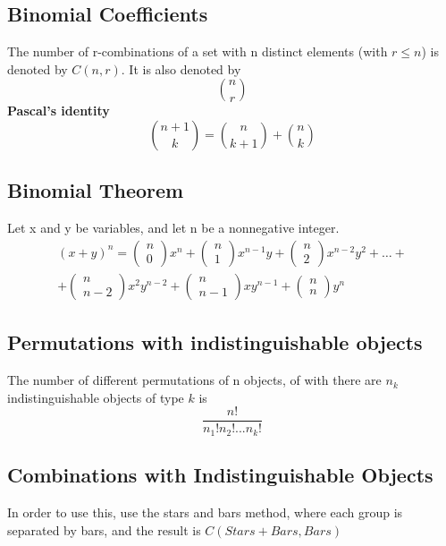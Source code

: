 \documentclass{article}[18pt]
\begin{document}
\subsection{Binomial Coefficients}
The number of r-combinations of a set with n distinct elements (with $r\leqslant n$) is denoted by $C(n,r)$. It is also denoted by
$$\binom{n}{r}$$
\textbf{Pascal's identity}
$$\binom{n+1}{k}=\binom{n}{k+1}+\binom{n}{k}$$
\subsection{Binomial Theorem}
Let x and y be variables, and let n be a nonnegative integer.
$$
\begin{array}{c}{(x+y)^{n}=\left( \begin{array}{c}{n} \\ {0}\end{array}\right) x^{n}+\left( \begin{array}{c}{n} \\ {1}\end{array}\right) x^{n-1} y+\left( \begin{array}{c}{n} \\ {2}\end{array}\right) x^{n-2} y^{2}+\ldots+} \\ {+\left( \begin{array}{c}{n} \\ {n-2}\end{array}\right) x^{2} y^{n-2}+\left( \begin{array}{c}{n} \\ {n-1}\end{array}\right) x y^{n-1}+\left( \begin{array}{c}{n} \\ {n}\end{array}\right) y^{n}}\end{array}
$$
\subsection{Permutations with indistinguishable objects}
The number of different permutations of n objects, of with there are $n_k$ indistinguishable objects of type $k$ is
$$\dfrac{n!}{n_1!n_2!...n_k!}$$
\subsection{Combinations with Indistinguishable Objects}
In order to use this, use the stars and bars method, where each group is separated by bars, and the result is $C(Stars+Bars,Bars)$
\end{document}
